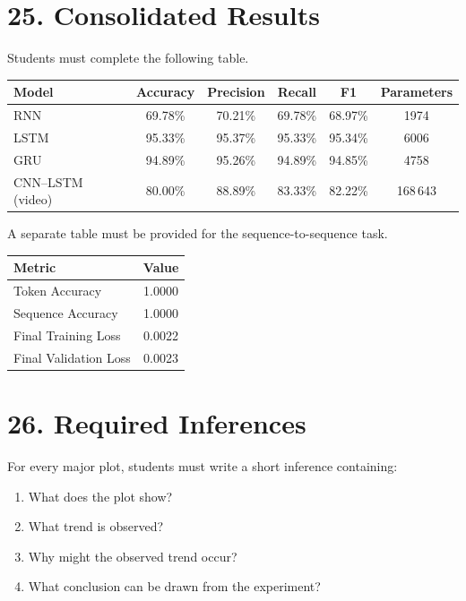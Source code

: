 \documentclass[10pt]{article}
\begin{document}
\section*{25. Consolidated Results}

Students must complete the following table.

\begin{center}
\begin{tabular}{|l|c|c|c|c|c|}
\hline
Model & Accuracy & Precision & Recall & F1 & Parameters\\
\hline
RNN & 69.78\% & 70.21\% & 69.78\% & 68.97\% & 1974\\
LSTM & 95.33\% & 95.37\% & 95.33\% & 95.34\% & 6006\\
GRU & 94.89\% & 95.26\% & 94.89\% & 94.85\% & 4758\\
CNN--LSTM (video) & 80.00\% & 88.89\% & 83.33\% & 82.22\% & 168\,643\\
\hline
\end{tabular}
\end{center}

A separate table must be provided for the sequence-to-sequence task.

\begin{center}
\begin{tabular}{|l|c|}
\hline
Metric & Value\\
\hline
Token Accuracy & 1.0000\\
Sequence Accuracy & 1.0000\\
Final Training Loss & 0.0022\\
Final Validation Loss & 0.0023\\
\hline
\end{tabular}
\end{center}


\section*{26. Required Inferences}

For every major plot, students must write a short inference containing:

\begin{enumerate}
\item What does the plot show?
\item What trend is observed?
\item Why might the observed trend occur?
\item What conclusion can be drawn from the experiment?
\end{enumerate}
\end{document}
